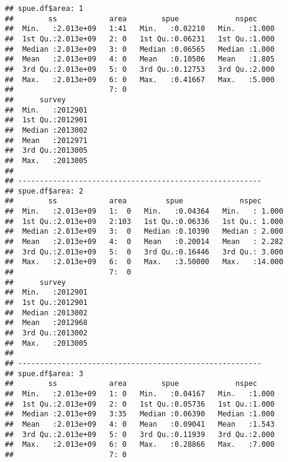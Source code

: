 \documentclass[]{article}
\newenvironment{Shaded}{\begin{snugshade}}{\end{snugshade}}
\newcommand{\KeywordTok}[1]{\textcolor[rgb]{0.13,0.29,0.53}{\textbf{#1}}}
\newcommand{\CommentTok}[1]{\textcolor[rgb]{0.56,0.35,0.01}{\textit{#1}}}
\newcommand{\OperatorTok}[1]{\textcolor[rgb]{0.81,0.36,0.00}{\textbf{#1}}}
\newcommand{\NormalTok}[1]{#1}
\begin{document}
\begin{Shaded}
\end{Shaded}

\begin{verbatim}
## spue.df$area: 1
##        ss            area        spue             nspec      
##  Min.   :2.013e+09   1:41   Min.   :0.02210   Min.   :1.000  
##  1st Qu.:2.013e+09   2: 0   1st Qu.:0.06231   1st Qu.:1.000  
##  Median :2.013e+09   3: 0   Median :0.06565   Median :1.000  
##  Mean   :2.013e+09   4: 0   Mean   :0.10506   Mean   :1.805  
##  3rd Qu.:2.013e+09   5: 0   3rd Qu.:0.12753   3rd Qu.:2.000  
##  Max.   :2.013e+09   6: 0   Max.   :0.41667   Max.   :5.000  
##                      7: 0                                    
##      survey       
##  Min.   :2012901  
##  1st Qu.:2012901  
##  Median :2013002  
##  Mean   :2012971  
##  3rd Qu.:2013005  
##  Max.   :2013005  
##                   
## -------------------------------------------------------- 
## spue.df$area: 2
##        ss            area         spue             nspec       
##  Min.   :2.013e+09   1:  0   Min.   :0.04364   Min.   : 1.000  
##  1st Qu.:2.013e+09   2:103   1st Qu.:0.06336   1st Qu.: 1.000  
##  Median :2.013e+09   3:  0   Median :0.10390   Median : 2.000  
##  Mean   :2.013e+09   4:  0   Mean   :0.20014   Mean   : 2.282  
##  3rd Qu.:2.013e+09   5:  0   3rd Qu.:0.16446   3rd Qu.: 3.000  
##  Max.   :2.013e+09   6:  0   Max.   :3.50000   Max.   :14.000  
##                      7:  0                                     
##      survey       
##  Min.   :2012901  
##  1st Qu.:2012901  
##  Median :2013002  
##  Mean   :2012968  
##  3rd Qu.:2013002  
##  Max.   :2013005  
##                   
## -------------------------------------------------------- 
## spue.df$area: 3
##        ss            area        spue             nspec      
##  Min.   :2.013e+09   1: 0   Min.   :0.04167   Min.   :1.000  
##  1st Qu.:2.013e+09   2: 0   1st Qu.:0.05736   1st Qu.:1.000  
##  Median :2.013e+09   3:35   Median :0.06390   Median :1.000  
##  Mean   :2.013e+09   4: 0   Mean   :0.09041   Mean   :1.543  
##  3rd Qu.:2.013e+09   5: 0   3rd Qu.:0.11939   3rd Qu.:2.000  
##  Max.   :2.013e+09   6: 0   Max.   :0.28866   Max.   :7.000  
##                      7: 0                                    

\end{verbatim}
\end{document}
